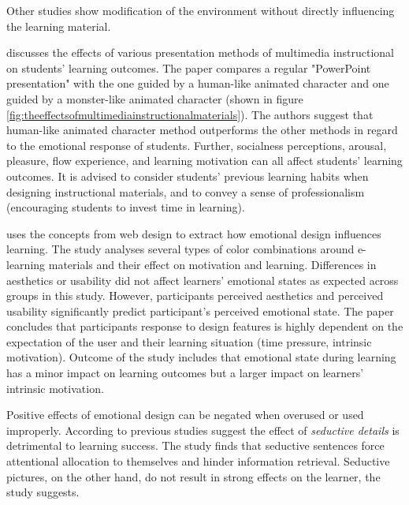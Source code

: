 		Other studies show modification of the environment without directly influencing the learning material.
		
		\cite{Lee2014} discusses the effects of various presentation methods of multimedia instructional on students’ learning outcomes. The paper compares a regular "PowerPoint presentation" with the one guided by a human-like animated character and one guided by a monster-like animated character (shown in figure \ref{fig:theeffectsofmultimediainstructionalmaterials}). The authors suggest that human-like animated character method outperforms the other methods in regard to the emotional response of students. Further, socialness perceptions, arousal, pleasure, flow experience, and learning motivation can all affect students’ learning outcomes. It is advised to consider students’ previous learning habits when designing instructional materials, and to convey a sense of professionalism (encouraging students to invest time in learning).
	
		\cite{Heidig2015} uses the concepts from web design to extract how emotional design influences learning. The study analyses several types of color combinations around e-learning materials and their effect on motivation and learning. Differences in aesthetics or usability did not affect learners’ emotional states as expected across groups in this study. However, participants perceived aesthetics and perceived usability significantly predict participant's perceived emotional state. The paper concludes that participants response to design features is highly dependent on the expectation of the user and their learning situation (time pressure, intrinsic motivation). Outcome of the study includes that emotional state during learning has a minor impact on learning outcomes but a larger impact on learners’ intrinsic motivation.
		
		Positive effects of emotional design can be negated when overused or used improperly. According to \cite{Chang2014} previous studies suggest the effect of \textit{seductive details} is detrimental to learning success. The study finds that seductive sentences force attentional allocation to themselves and hinder information retrieval. Seductive pictures, on the other hand, do not result in strong effects on the learner, the study suggests.
		
		
